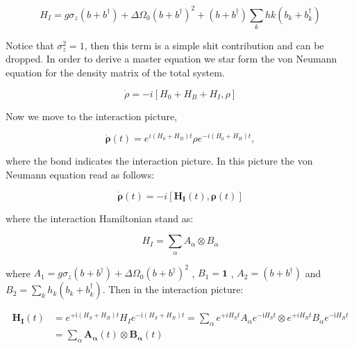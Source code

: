\documentclass[%
preprint,
onecolumn,
notitlepag,
 amsmath,amssymb,
 aps,
 pra,
]{revtex4-2}
\begin{document}
\begin{equation}
    H_I= g \sigma_z  \left( b + b ^{\dagger} \right) +  \Delta \Omega_0 \left( b + b ^{\dagger} \right)^2 +   \left( b + b ^{\dagger} \right) \sum_k hk \left( b_k + b_k ^{\dagger} \right)
\end{equation}

Notice that $\sigma_z^2= 1$, then this term is a simple shit contribution and can be dropped. In order to derive a master equation we star form the von Neumann equation for the density matrix of the total system.

\begin{equation}
    \dot{\rho} = -i \left[ H_0 + H_B + H_I , \rho \right]
\end{equation}

Now we move to the interaction picture, 

\begin{equation}
  \dot{\boldsymbol{\rho}}(t) = e^{i (H_0+H_B) t} \rho e^{-i (H_0+H_B) t},
\end{equation}

where the bond indicates the interaction picture. In this picture the von Neumann equation read as follows:

\begin{equation}
  \dot{\boldsymbol{\rho}}(t) = -i \left[  \mathbf{H_I}(t) ,  \boldsymbol{\rho}(t)\right]
\end{equation}

where the interaction Hamiltonian stand as: 

\begin{equation}
H_{I}=\sum_{\alpha} A_{\alpha} \otimes B_{\alpha}
\end{equation}

where $A_1= g \sigma_z  \left( b + b ^{\dagger} \right) +  \Delta \Omega_0 \left( b + b ^{\dagger} \right)^2  $ , $B_1= \mathbf{1}$ , $A_2= \left( b + b ^{\dagger} \right) $ and $B_2= \sum_k h_k \left( b_k + b_k ^{\dagger} \right)$. Then in the interaction picture: 

\begin{equation}
\begin{aligned}
\boldsymbol{H}_{\boldsymbol{I}}(t) &=e^{+\mathrm{i}\left(H_{S}+H_{B}\right) t} H_{I} e^{-\mathrm{i}\left(H_{S}+H_{B}\right) t}=\sum_{\alpha} e^{+i H_{S} t} A_{\alpha} e^{-\mathrm{i} H_{S} t} \otimes e^{+i H_{B} t} B_{\alpha} e^{-\mathrm{i} H_{B} t} \\
&=\sum_{\alpha} \boldsymbol{A}_{\boldsymbol{\alpha}}(t) \otimes \boldsymbol{B}_{\boldsymbol{\alpha}}(t)
\end{aligned}
\end{equation}
\end{document}

